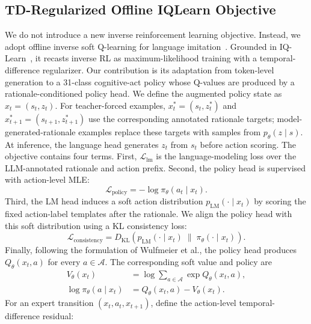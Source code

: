 \documentclass[manuscript,review,anonymous]{acmart}
\begin{document}
\subsection{TD-Regularized Offline IQLearn Objective}

We do not introduce a new inverse reinforcement learning objective.
Instead, we adopt offline inverse soft Q-learning for language
imitation~\citep{wulfmeier2024imitating}. Grounded in
IQ-Learn~\citep{garg2021iqlearn}, it recasts inverse RL as maximum-likelihood
training with a temporal-difference regularizer.
Our contribution is its adaptation from token-level generation to a 31-class cognitive-act policy whose Q-values are produced by a rationale-conditioned policy head.
We define the augmented policy state as $x_t=(s_t,z_t)$. For teacher-forced examples, $x_t^*=(s_t,z_t^*)$ and $x_{t+1}^*=(s_{t+1},z_{t+1}^*)$ use the corresponding annotated rationale targets; model-generated-rationale examples replace these targets with samples from $p_\theta(z\mid s)$. At inference, the language head generates $z_t$ from $s_t$ before action scoring.
The objective contains four terms.
First, $\mathcal{L}_{\mathrm{lm}}$ is the language-modeling loss over the LLM-annotated rationale and action prefix.
Second, the policy head is supervised with action-level MLE:
\begin{equation}
\mathcal{L}_{\mathrm{policy}}
=
-\log \pi_\theta(a_t\mid x_t).
\end{equation}
Third, the LM head induces a soft action distribution $p_{\mathrm{LM}}(\cdot\mid x_t)$ by scoring the fixed action-label templates after the rationale.
We align the policy head with this soft distribution using a KL consistency loss:
\begin{equation}
\mathcal{L}_{\mathrm{consistency}}
=
D_{\mathrm{KL}}\!\left(
p_{\mathrm{LM}}(\cdot\mid x_t)
\;\|\;
\pi_\theta(\cdot\mid x_t)
\right).
\end{equation}
Finally, following the formulation of Wulfmeier et al., the policy head produces $Q_\theta(x_t,a)$ for every $a\in\mathcal{A}$.
The corresponding soft value and policy are
\begin{equation}
\begin{aligned}
V_\theta(x_t)
&=\log\!\sum_{a\in\mathcal{A}}\exp Q_\theta(x_t,a),\\
\log\pi_\theta(a\mid x_t)
&=Q_\theta(x_t,a)-V_\theta(x_t).
\end{aligned}
\end{equation}
For an expert transition $(x_t,a_t,x_{t+1})$, define the action-level temporal-difference residual:
\end{document}
